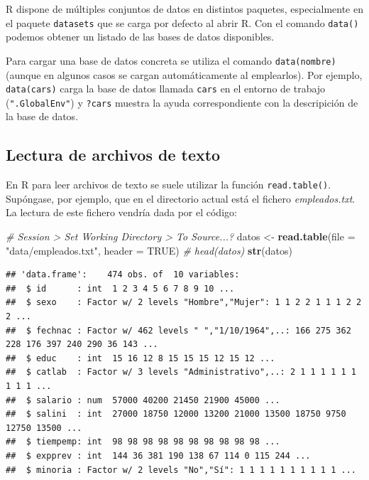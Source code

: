 \documentclass[]{book}
\newenvironment{Shaded}{\begin{snugshade}}{\end{snugshade}}
\newcommand{\KeywordTok}[1]{\textcolor[rgb]{0.13,0.29,0.53}{\textbf{#1}}}
\newcommand{\DataTypeTok}[1]{\textcolor[rgb]{0.13,0.29,0.53}{#1}}
\newcommand{\StringTok}[1]{\textcolor[rgb]{0.31,0.60,0.02}{#1}}
\newcommand{\CommentTok}[1]{\textcolor[rgb]{0.56,0.35,0.01}{\textit{#1}}}
\newcommand{\OtherTok}[1]{\textcolor[rgb]{0.56,0.35,0.01}{#1}}
\newcommand{\NormalTok}[1]{#1}
\begin{document}
R dispone de múltiples conjuntos de datos en distintos paquetes,
especialmente en el paquete \texttt{datasets} que se carga por defecto
al abrir R. Con el comando \texttt{data()} podemos obtener un listado de
las bases de datos disponibles.

Para cargar una base de datos concreta se utiliza el comando
\texttt{data(nombre)} (aunque en algunos casos se cargan automáticamente
al emplearlos). Por ejemplo, \texttt{data(cars)} carga la base de datos
llamada \texttt{cars} en el entorno de trabajo (\texttt{".GlobalEnv"}) y
\texttt{?cars} muestra la ayuda correspondiente con la descripición de
la base de datos.

\subsection{Lectura de archivos de texto}\label{cap2-texto}

En R para leer archivos de texto se suele utilizar la función
\texttt{read.table()}. Supóngase, por ejemplo, que en el directorio
actual está el fichero \emph{empleados.txt}. La lectura de este fichero
vendría dada por el código:

\begin{Shaded}
\begin{Highlighting}[]
\CommentTok{# Session > Set Working Directory > To Source...?}
\NormalTok{datos <-}\StringTok{ }\KeywordTok{read.table}\NormalTok{(}\DataTypeTok{file =} \StringTok{"data/empleados.txt"}\NormalTok{, }\DataTypeTok{header =} \OtherTok{TRUE}\NormalTok{)}
\CommentTok{# head(datos)}
\KeywordTok{str}\NormalTok{(datos)}
\end{Highlighting}
\end{Shaded}

\begin{verbatim}
## 'data.frame':    474 obs. of  10 variables:
##  $ id      : int  1 2 3 4 5 6 7 8 9 10 ...
##  $ sexo    : Factor w/ 2 levels "Hombre","Mujer": 1 1 2 2 1 1 1 2 2 2 ...
##  $ fechnac : Factor w/ 462 levels " ","1/10/1964",..: 166 275 362 228 176 397 240 290 36 143 ...
##  $ educ    : int  15 16 12 8 15 15 15 12 15 12 ...
##  $ catlab  : Factor w/ 3 levels "Administrativo",..: 2 1 1 1 1 1 1 1 1 1 ...
##  $ salario : num  57000 40200 21450 21900 45000 ...
##  $ salini  : int  27000 18750 12000 13200 21000 13500 18750 9750 12750 13500 ...
##  $ tiempemp: int  98 98 98 98 98 98 98 98 98 98 ...
##  $ expprev : int  144 36 381 190 138 67 114 0 115 244 ...
##  $ minoria : Factor w/ 2 levels "No","Sí": 1 1 1 1 1 1 1 1 1 1 ...
\end{verbatim}
\end{document}
